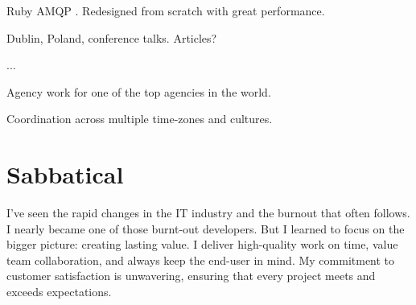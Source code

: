 \startitemize
  \item Ruby AMQP . Redesigned from scratch with great performance.
  \item Dublin, Poland, conference talks. Articles?
  \item ...
\stopitemize


\startitemize
  \item Agency work for one of the top agencies in the world.
  \item Coordination across multiple time-zones and cultures.
\stopitemize

\section{Sabbatical}
I’ve seen the rapid changes in the IT industry and the burnout that often follows. I nearly became one of those burnt-out developers. But I learned to focus on the bigger picture: creating lasting value. I deliver high-quality work on time, value team collaboration, and always keep the end-user in mind. My commitment to customer satisfaction is unwavering, ensuring that every project meets and exceeds expectations.



